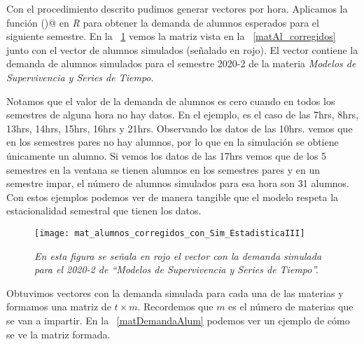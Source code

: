 Con el procedimiento descrito pudimos generar vectores por hora. Aplicamos la función \verb@hw()@ en \textit{R} para obtener la demanda de alumnos esperados para el siguiente semestre. En la \figurename{~\ref{matAl_corregidos_y_sim}} vemos la matriz vista en la \figurename{~\ref{matAl_corregidos}} junto con el vector de alumnos simulados (señalado en rojo). El vector contiene la demanda de alumnos simulados para el semestre 2020-2 de la materia \textit{Modelos de Supervivencia y Series de Tiempo}.

Notamos que el valor de la demanda de alumnos es cero cuando en todos los semestres de alguna hora no hay datos. En el ejemplo, es el caso de las 7hrs, 8hrs, 13hrs, 14hrs, 15hrs, 16hrs y 21hrs. Observando los datos de las 10hrs. vemos que en los semestres pares no hay alumnos, por lo que en la simulación se obtiene únicamente un alumno. Si vemos los datos de las 17hrs vemos que de los 5 semestres en la ventana se tienen alumnos en los semestres pares y en un semestre impar, el número de alumnos simulados para esa hora son 31 alumnos. Con estos ejemplos podemos ver de manera tangible que el modelo respeta la estacionalidad semestral que tienen los datos.

\begin{figure}[H]
\centering
\texttt{[image: mat\_alumnos\_corregidos\_con\_Sim\_EstadisticaIII]} %
\caption[\textit{Ejemplo de vector con demanda simulada para el 2020-2 de ``Modelos de Supervivencia y Series de Tiempo''}]{\textit{En esta figura se señala en rojo el vector con la demanda simulada para el 2020-2 de ``Modelos de Supervivencia y Series de Tiempo''.}}\label{matAl_corregidos_y_sim}
\end{figure}


Obtuvimos vectores con la demanda simulada para cada una de las materias y formamos una matriz de $t \times m$. Recordemos que $m$ es el número de materias que se van a impartir. En la \figurename{~\ref{matDemandaAlum}} podemos ver un ejemplo de cómo se ve la matriz formada.

